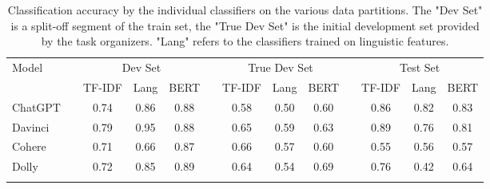 \begin{table}[ht]
    \centering
    \vspace{0.1cm}
    \begin{tabular}{lp{5px}cccp{5px}cccp{5px}ccc}
        \hline
        \multirow{2}{*}{Model} &  & \multicolumn{3}{c}{Dev Set} &             & \multicolumn{3}{c}{True Dev Set} &  & \multicolumn{3}{c}{Test Set}                                                                            \\
                               &  & \tiny{TF-IDF}               & \tiny{Lang} & \tiny{BERT}                      &  & \tiny{TF-IDF}                & \tiny{Lang} & \tiny{BERT} &  & \tiny{TF-IDF} & \tiny{Lang} & \tiny{BERT} \\
        \hline
        ChatGPT                &  & 0.74                        & 0.86        & 0.88                             &  & 0.58                         & 0.50        & 0.60        &  & 0.86          & 0.82        & 0.83        \\
        Davinci                &  & 0.79                        & 0.95        & 0.88                             &  & 0.65                         & 0.59        & 0.63        &  & 0.89          & 0.76        & 0.81        \\
        Cohere                 &  & 0.71                        & 0.66        & 0.87                             &  & 0.66                         & 0.57        & 0.60        &  & 0.55          & 0.56        & 0.57        \\
        Dolly                  &  & 0.72                        & 0.85        & 0.89                             &  & 0.64                         & 0.54        & 0.69        &  & 0.76          & 0.42        & 0.64        \\
        \hline
        \vspace{0.1cm}
    \end{tabular}
    \caption{
        Classification accuracy by the individual classifiers on the various data partitions.
        The "Dev Set" is a split-off segment of the train set, the "True Dev Set" is the initial development set provided by the task organizers.
        "Lang" refers to the classifiers trained on linguistic features.
    }
    \label{tab:subsolutions-initial}
\end{table}

